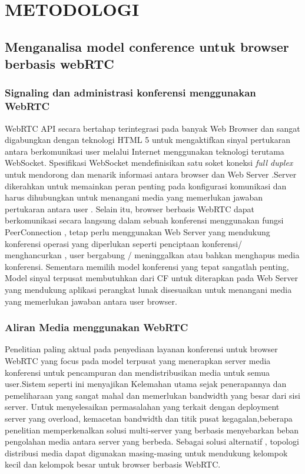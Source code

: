 \documentclass{jtetiproposalskripsi}
\begin{document}
\chapter{METODOLOGI}

\section{Menganalisa model conference untuk browser berbasis webRTC}
\subsection{Signaling dan administrasi konferensi menggunakan WebRTC}
WebRTC API secara bertahap terintegrasi pada banyak Web Browser dan sangat digabungkan dengan teknologi HTML 5 untuk mengaktifkan sinyal pertukaran antara berkomunikasi user melalui Internet menggunakan teknologi terutama WebSocket. Spesifikasi WebSocket mendefinisikan satu soket koneksi \emph{full duplex} untuk mendorong dan menarik informasi antara browser dan Web Server .Server dikerahkan untuk memainkan peran penting pada konfigurasi komunikasi dan harus dihubungkan untuk menangani media yang memerlukan jawaban pertukaran antara user . Selain itu, browser berbasis WebRTC dapat berkomunikasi secara langsung dalam sebuah konferensi menggunakan fungsi PeerConnection , tetap perlu menggunakan Web Server yang mendukung konferensi operasi yang diperlukan seperti penciptaan konferensi/ menghancurkan , user bergabung / meninggalkan atau bahkan menghapus media konferensi. Sementara memilih model konferensi yang tepat sangatlah penting, Model sinyal terpusat membutuhkan dari CF untuk diterapkan pada Web Server yang mendukung aplikasi perangkat lunak disesuaikan untuk menangani media yang memerlukan jawaban antara user browser.
\subsection{Aliran Media menggunakan WebRTC}
Penelitian paling aktual pada penyediaan layanan konferensi untuk browser WebRTC yang focus pada model terpusat yang menerapkan server media konferensi untuk pencampuran dan mendistribusikan media untuk semua user.Sistem seperti ini menyajikan Kelemahan utama sejak penerapannya dan pemeliharaan yang sangat mahal dan memerlukan bandwidth yang besar dari sisi server. Untuk menyelesaikan permasalahan yang terkait dengan deployment server yang overload, kemacetan bandwidth dan titik pusat kegagalan,beberapa penelitian memperkenalkan solusi multi-server yang berbasis menyebarkan beban pengolahan media antara server yang berbeda. Sebagai solusi alternatif , topologi distribusi media dapat digunakan masing-masing untuk mendukung kelompok kecil dan kelompok besar untuk browser berbasis WebRTC.
\end{document}
